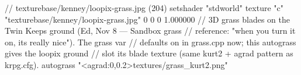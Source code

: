// texturebase/kenney/loopix-grass.jpg (204)
setshader "stdworld"
texture "c" "texturebase/kenney/loopix-grass.jpg" 0 0 0 1.000000
// 3D grass blades on the Twin Keeps ground (Ed, Nov 8 — Sandbox grass
// reference: "when you turn it on, its really nice"). The grass var
// defaults on in grass.cpp now; this autograss gives the loopix ground
// slot its blade texture (same kurt2 + agrad pattern as krpg.cfg).
autograss "<agrad:0,0.2>textures/grass_kurt2.png"

